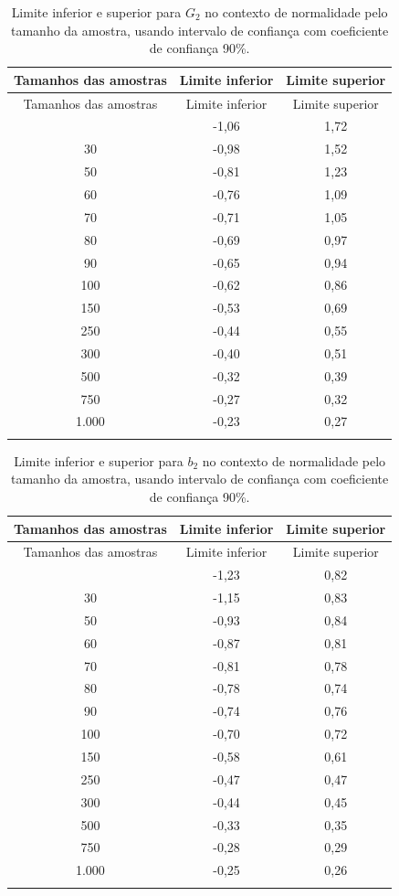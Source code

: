 \documentclass[
  10pt,
  ignorenonframetext,
]{beamer}
\begin{document}
\begin{frame}
\begin{longtable}[]{@{}ccc@{}}
\caption{Limite inferior e superior para \(G_2\) no contexto de
normalidade pelo tamanho da amostra, usando intervalo de confiança com
coeficiente de confiança 90\%.}\tabularnewline
\toprule\noalign{}
Tamanhos das amostras & Limite inferior & Limite superior \\
\midrule\noalign{}
\endfirsthead
\toprule\noalign{}
Tamanhos das amostras & Limite inferior & Limite superior \\
\midrule\noalign{}
\endhead
25 & -1,06 & 1,72 \\
30 & -0,98 & 1,52 \\
50 & -0,81 & 1,23 \\
60 & -0,76 & 1,09 \\
70 & -0,71 & 1,05 \\
80 & -0,69 & 0,97 \\
90 & -0,65 & 0,94 \\
100 & -0,62 & 0,86 \\
150 & -0,53 & 0,69 \\
250 & -0,44 & 0,55 \\
300 & -0,40 & 0,51 \\
500 & -0,32 & 0,39 \\
750 & -0,27 & 0,32 \\
1.000 & -0,23 & 0,27 \\
\bottomrule\noalign{}
\end{longtable}
\end{frame}

\begin{frame}
\begin{longtable}[]{@{}ccc@{}}
\caption{Limite inferior e superior para \(b_2\) no contexto de
normalidade pelo tamanho da amostra, usando intervalo de confiança com
coeficiente de confiança 90\%.}\tabularnewline
\toprule\noalign{}
Tamanhos das amostras & Limite inferior & Limite superior \\
\midrule\noalign{}
\endfirsthead
\toprule\noalign{}
Tamanhos das amostras & Limite inferior & Limite superior \\
\midrule\noalign{}
\endhead
25 & -1,23 & 0,82 \\
30 & -1,15 & 0,83 \\
50 & -0,93 & 0,84 \\
60 & -0,87 & 0,81 \\
70 & -0,81 & 0,78 \\
80 & -0,78 & 0,74 \\
90 & -0,74 & 0,76 \\
100 & -0,70 & 0,72 \\
150 & -0,58 & 0,61 \\
250 & -0,47 & 0,47 \\
300 & -0,44 & 0,45 \\
500 & -0,33 & 0,35 \\
750 & -0,28 & 0,29 \\
1.000 & -0,25 & 0,26 \\
\bottomrule\noalign{}
\end{longtable}
\end{frame}
\end{document}
